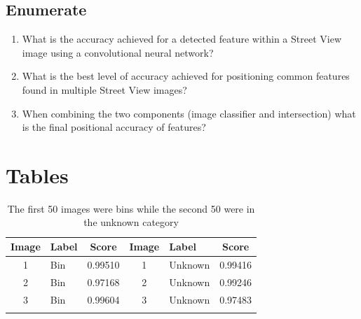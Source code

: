 \subsection{Enumerate}
\begin{enumerate}
\item What is the accuracy achieved for a detected feature within a Street View image using a convolutional neural network?
\item What is the best level of accuracy achieved for positioning common features found in multiple Street View images?
\item When combining the two components (image classifier and intersection) what is the final positional accuracy of features?
\end{enumerate}

\section{Tables}

\begin{table}[H]
\caption[Classifier Results]{The first 50 images were bins while the second 50 were in the unknown category}
\label{tab:classifier_results}
\centering
\begin{tabular}{c l c | c l c}
\toprule
\textbf{Image} & \textbf{Label} & \textbf{Score} & \textbf{Image} & \textbf{Label} & \textbf{Score} \\
\midrule
1 & Bin & 0.99510 & 1 & Unknown & 0.99416 \\
2 & Bin & 0.97168 & 2 & Unknown & 0.99246 \\
3 & Bin & 0.99604 & 3 & Unknown & 0.97483 \\
\bottomrule\\
\end{tabular}
\end{table}
